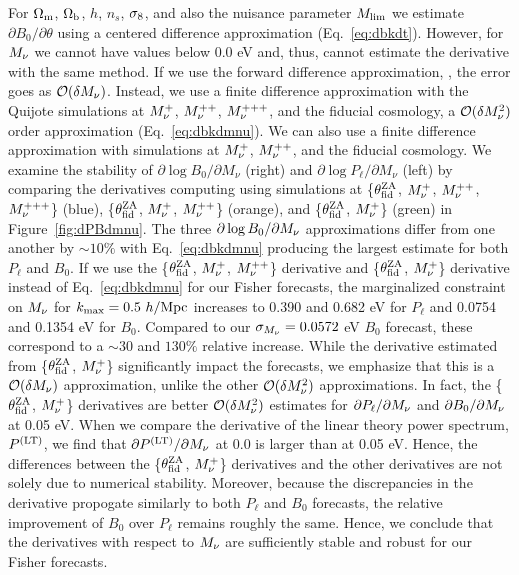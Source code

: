 For $\Omega_{\rm m}$, $\Omega_{\rm b}$, $h$, $n_s$, $\sigma_8$, and also the nuisance parameter $M_{\rm lim}$ 
we estimate $\partial B_0/\partial \theta$ using a centered difference approximation 
(Eq.~\ref{eq:dbkdt}). However, for $M_\nu$ we cannot have values below 0.0 eV 
and, thus, cannot estimate the derivative with the same method. If we use the 
forward difference approximation, 
\beq 
{} \approx {}, 
\eeq
the error goes as $\mathcal{O}(\delta M_\nu)$. Instead, we use a finite difference
approximation with the Quijote simulations at $M_\nu^{+}$, $M_\nu^{++}$, $M_\nu^{+++}$, 
and the fiducial cosmology, a $\mathcal{O}(\delta M_\nu^2)$ order approximation 
(Eq.~\ref{eq:dbkdmnu}). We can also use a finite difference approximation with 
simulations at $M_\nu^{+}$, $M_\nu^{++}$, and the fiducial cosmology. We examine
the stability of $\partial \log B_0/\partial M_\nu$ (right) and 
$\partial \log P_\ell/\partial M_\nu$ (left) by comparing the derivatives computing
using simulations at \{$\theta_{\rm fid}^{\rm ZA}$, $M_\nu^{+}$, $M_\nu^{++}$, $M_\nu^{+++}$\} (blue), 
\{$\theta_{\rm fid}^{\rm ZA}$, $M_\nu^{+}$, $M_\nu^{++}$\} (orange), and \{$\theta_{\rm fid}^{\rm ZA}$, $M_\nu^{+}$\} 
(green) in Figure~\ref{fig:dPBdmnu}. The three $\partial \log B_0/\partial M_\nu$
approximations differ from one another by $\sim10\%$ with Eq.~\ref{eq:dbkdmnu} 
producing the largest estimate for both $P_\ell$ and $B_0$. If we use the
\{$\theta_{\rm fid}^{\rm ZA}$, $M_\nu^{+}$, $M_\nu^{++}$\} derivative and 
\{$\theta_{\rm fid}^{\rm ZA}$, $M_\nu^{+}$\} derivative 
instead of Eq.~\ref{eq:dbkdmnu} for our Fisher forecasts, the marginalized constraint on
$M_\nu$ for $k_{\rm max} = 0.5~h/{\rm Mpc}$ increases to 0.390 and 0.682 eV for $P_\ell$ 
and 0.0754 and 0.1354 eV for $B_0$. Compared to our $\sigma_{M_\nu} = 0.0572$ eV 
$B_0$ forecast, these correspond to a $\sim30$ and $130\%$ relative increase. 
While the derivative estimated from \{$\theta_{\rm fid}^{\rm ZA}$, $M_\nu^{+}$\} significantly 
impact the forecasts, we emphasize that this is a $\mathcal{O}(\delta M_\nu)$ approximation, 
unlike the other $\mathcal{O}(\delta M_\nu^2)$ approximations. In fact, the 
\{$\theta_{\rm fid}^{\rm ZA}$, $M_\nu^{+}$\} derivatives are better $\mathcal{O}(\delta M_\nu^2)$ 
estimates for $\partial P_\ell/\partial M_\nu$ and $\partial B_0/\partial M_\nu$ at 0.05 eV. 
When we compare the derivative of the linear theory power spectrum, $P^{(\rm LT)}$, 
we find that $\partial P^{(\rm LT)}/\partial M_\nu$ at 0.0 is larger than at 0.05 eV. 
Hence, the differences between the \{$\theta_{\rm fid}^{\rm ZA}$, $M_\nu^{+}$\} derivatives 
and the other derivatives are not solely due to numerical stability. Moreover, because the 
discrepancies in the derivative propogate similarly to both $P_\ell$ and $B_0$ forecasts, 
the relative improvement of $B_0$ over $P_\ell$ remains roughly the same.
Hence, we conclude that the derivatives with respect to $M_\nu$ are sufficiently 
stable and robust for our Fisher forecasts.

